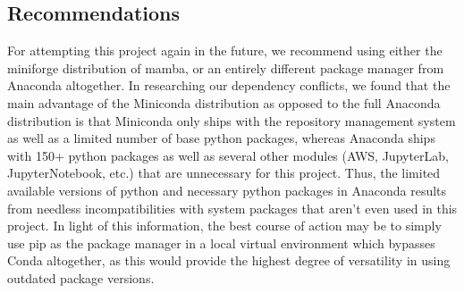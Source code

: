 \documentclass{article}
\begin{document}
\subsection{Recommendations} 
For attempting this project again in the future, we recommend using either the miniforge distribution of mamba, or an entirely different package manager from Anaconda altogether. In researching our dependency conflicts, we found that the main advantage of the  Miniconda distribution as opposed to the full Anaconda distribution is that Miniconda only ships with the repository management system as well as a limited number of base python packages, whereas Anaconda ships with 150+ python packages as well as several other modules (AWS, JupyterLab, JupyterNotebook, etc.) that are unnecessary for this project. Thus, the limited available versions of python and necessary python packages in Anaconda results from needless incompatibilities with system packages that aren't even used in this project. In light of this information, the best course of action may be to simply use pip as the package manager in a local virtual environment which bypasses Conda altogether, as this would provide the highest degree of versatility in using outdated package versions.
\end{document}
